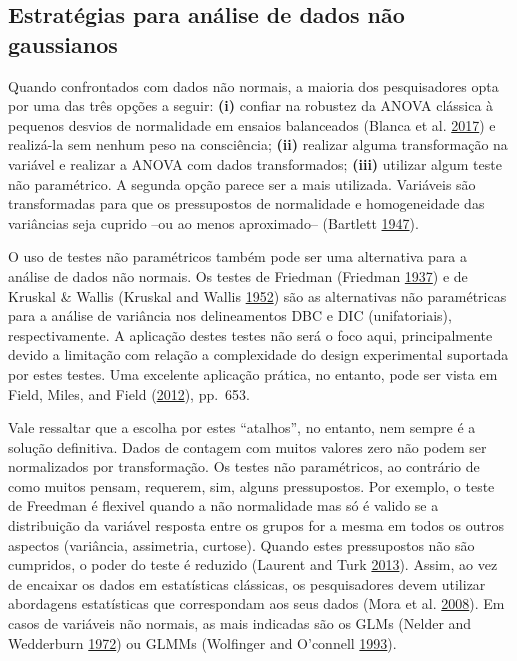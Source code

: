 \documentclass[
]{book}
\numberwithin{equation}{section}
\newcommand{\indt}[1]{\index{#1|ST}}
\begin{document}
\hypertarget{estratuxe9gias-para-anuxe1lise-de-dados-nuxe3o-gaussianos}{%
\subsection{Estratégias para análise de dados não gaussianos}\label{estratuxe9gias-para-anuxe1lise-de-dados-nuxe3o-gaussianos}}

Quando confrontados com dados não normais, a maioria dos pesquisadores opta por uma das três opções a seguir: \textbf{(i)} confiar na robustez da ANOVA\indt{ANOVA} clássica à pequenos desvios de normalidade em ensaios balanceados (Blanca et al. \protect\hyperlink{ref-Blanca2017}{2017}) e realizá-la sem nenhum peso na consciência; \textbf{(ii)} realizar alguma transformação na variável e realizar a ANOVA\indt{ANOVA} com dados transformados; \textbf{(iii)} utilizar algum teste não paramétrico. A segunda opção parece ser a mais utilizada. Variáveis são transformadas para que os pressupostos de normalidade e homogeneidade das variâncias seja cuprido --ou ao menos aproximado-- (Bartlett \protect\hyperlink{ref-Bartlett1947}{1947}).

O uso de testes não paramétricos também pode ser uma alternativa para a análise de dados não normais. Os testes de Friedman (Friedman \protect\hyperlink{ref-Friedman1937}{1937}) e de Kruskal \& Wallis (Kruskal and Wallis \protect\hyperlink{ref-Kruskal1952}{1952}) são as alternativas não paramétricas para a análise de variância nos delineamentos DBC e DIC (unifatoriais), respectivamente. A aplicação destes testes não será o foco aqui, principalmente devido a limitação com relação a complexidade do design experimental suportada por estes testes. Uma excelente aplicação prática, no entanto, pode ser vista em Field, Miles, and Field (\protect\hyperlink{ref-Field2012}{2012}), pp.~653.

Vale ressaltar que a escolha por estes ``atalhos'', no entanto, nem sempre é a solução definitiva. Dados de contagem com muitos valores zero não podem ser normalizados por transformação. Os testes não paramétricos, ao contrário de como muitos pensam, requerem, sim, alguns pressupostos. Por exemplo, o teste de Freedman é flexivel quando a não normalidade mas só é valido se a distribuição da variável resposta entre os grupos for a mesma em todos os outros aspectos (variância, assimetria, curtose). Quando estes pressupostos não são cumpridos, o poder do teste é reduzido (Laurent and Turk \protect\hyperlink{ref-Laurent2013}{2013}). Assim, ao vez de encaixar os dados em estatísticas clássicas, os pesquisadores devem utilizar abordagens estatísticas que correspondam aos seus dados (Mora et al. \protect\hyperlink{ref-Mora2008}{2008}). Em casos de variáveis não normais, as mais indicadas são os GLMs\indt{GLMs} (Nelder and Wedderburn \protect\hyperlink{ref-Nelder1972}{1972}) ou GLMMs\indt{GLMMs} (Wolfinger and O'connell \protect\hyperlink{ref-Wolfinger1993}{1993}).
\end{document}
